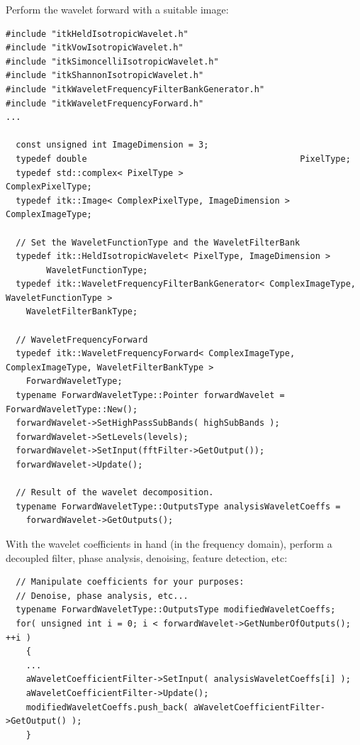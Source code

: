 \documentclass{InsightArticle}
\theoremstyle{definition}
\begin{document}
Perform the wavelet forward with a suitable image:
\begin{verbatim}
#include "itkHeldIsotropicWavelet.h"
#include "itkVowIsotropicWavelet.h"
#include "itkSimoncelliIsotropicWavelet.h"
#include "itkShannonIsotropicWavelet.h"
#include "itkWaveletFrequencyFilterBankGenerator.h"
#include "itkWaveletFrequencyForward.h"
...

  const unsigned int ImageDimension = 3;
  typedef double                                          PixelType;
  typedef std::complex< PixelType >                       ComplexPixelType;
  typedef itk::Image< ComplexPixelType, ImageDimension >  ComplexImageType;

  // Set the WaveletFunctionType and the WaveletFilterBank
  typedef itk::HeldIsotropicWavelet< PixelType, ImageDimension >
        WaveletFunctionType;
  typedef itk::WaveletFrequencyFilterBankGenerator< ComplexImageType, WaveletFunctionType >
    WaveletFilterBankType;

  // WaveletFrequencyForward
  typedef itk::WaveletFrequencyForward< ComplexImageType, ComplexImageType, WaveletFilterBankType >
    ForwardWaveletType;
  typename ForwardWaveletType::Pointer forwardWavelet = ForwardWaveletType::New();
  forwardWavelet->SetHighPassSubBands( highSubBands );
  forwardWavelet->SetLevels(levels);
  forwardWavelet->SetInput(fftFilter->GetOutput());
  forwardWavelet->Update();

  // Result of the wavelet decomposition.
  typename ForwardWaveletType::OutputsType analysisWaveletCoeffs =
    forwardWavelet->GetOutputs();
\end{verbatim}

With the wavelet coefficients in hand (in the frequency domain), perform a decoupled filter, phase analysis, denoising, feature detection, etc:
\begin{verbatim}
  // Manipulate coefficients for your purposes:
  // Denoise, phase analysis, etc...
  typename ForwardWaveletType::OutputsType modifiedWaveletCoeffs;
  for( unsigned int i = 0; i < forwardWavelet->GetNumberOfOutputs(); ++i )
    {
    ...
    aWaveletCoefficientFilter->SetInput( analysisWaveletCoeffs[i] );
    aWaveletCoefficientFilter->Update();
    modifiedWaveletCoeffs.push_back( aWaveletCoefficientFilter->GetOutput() );
    }
\end{verbatim}
\end{document}
